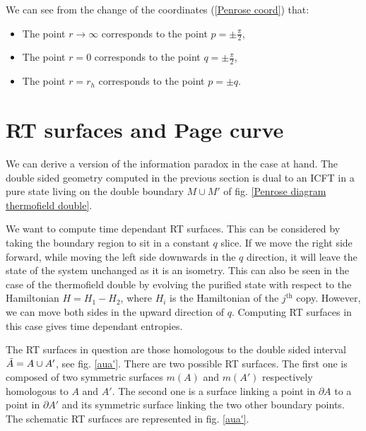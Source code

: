 We can see from the change of the coordinates (\ref{Penrose coord}) that:
\begin{itemize}
  \item The point $r\to\infty$ corresponds to the point $p=\pm\frac{\pi}{2}$,
  \item The point $r=0$ corresponds to the point $q=\pm\frac{\pi}{2}$,
  \item The point $r=r_h$ corresponds to the point $p=\pm q$.
\end{itemize}

\section{RT surfaces and Page curve}

We can derive a version of the information paradox in the case at hand. The double sided geometry computed in the previous section is dual to an ICFT in a pure state living on the double boundary $M\cup M'$ of fig. \ref{Penrose diagram thermofield double}.

We want to compute time dependant RT surfaces. This can be considered by taking the boundary region to sit in a constant $q$ slice. If we move the right side forward, while moving the left side downwards in the $q$ direction, it will leave the state of the system unchanged as it is an isometry. This can also be seen in the case of the thermofield double by evolving the purified state with respect to the Hamiltonian $H = H_1-H_2$, where $H_i$ is the Hamiltonian of the $j^\text{th}$ copy. However, we can move both sides in the upward direction of $q$. Computing RT surfaces in this case gives time dependant entropies.

The RT surfaces in question are those homologous to the double sided interval $\Tilde{A}=A\cup A'$, see fig. \ref{aua'}. There are two possible RT surfaces. The first one is composed of two symmetric surfaces $m(A)$ and $m(A')$ respectively homologous to $A$ and $A'$. The second one is a surface linking a point in $\partial A$ to a point in $\partial A'$ and its symmetric surface linking the two other boundary points. The schematic RT surfaces are represented in fig. \ref{aua'}.

